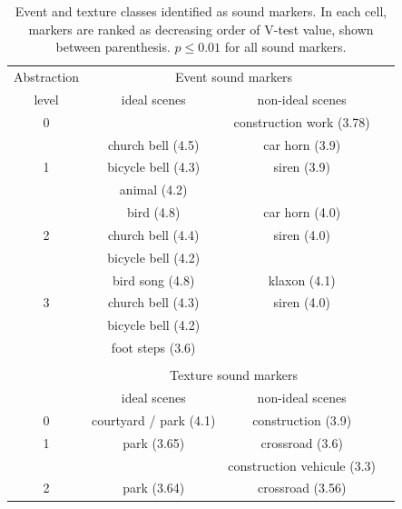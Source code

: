 \documentclass[12pt]{elsarticle}
\newcommand{\cf}{cf.}
\begin{document}
\begin{table}[t]
 \setlength{\tabcolsep}{0.2pt}
 \centering
  {\renewcommand{\arraystretch}{0.9}
\begin{tabular}{c c c c}
Abstraction        & \multicolumn{2}{c}{Event sound markers} \\
level & ideal scenes & non-ideal scenes \\
\hline
0  &                          & construction work (3.78)  \\
\hline
  & church bell  (4.5)             & car horn  (3.9) \\
1 & bicycle bell  (4.3)      & siren (3.9)\\
  & animal (4.2)              &       \\
   \hline
  & bird        (4.8)       & car horn  (4.0)\\
2 & church bell  (4.4)             & siren (4.0)\\
  & bicycle bell     (4.2)             &       \\
   \hline
  & bird song (4.8)        & klaxon  (4.1)\\
3 & church bell   (4.3)            & siren (4.0)\\
  & bicycle bell      (4.2)   &       \\
  & foot steps  (3.6)      &  \\
  &                           & \\
  & \multicolumn{2}{c}{Texture sound markers}      \\
  & ideal scenes & non-ideal scenes \\
\hline
0 &     courtyard / park (4.1) &  construction (3.9)  \\
\hline
1 &     park (3.65)          &  crossroad (3.6)  \\
  &                          &  construction vehicule (3.3)  \\
\hline
2 &     park (3.64)          &  crossroad (3.56)  \\
\hline
\end{tabular}
}
\vspace{0.5mm}
\caption{Event and texture classes identified as sound markers. In each cell, markers are ranked as decreasing order of V-test value, shown between parenthesis. $p\leq0.01$ for all sound markers.}
\label{tab:markers}
\end{table}

\end{document}
